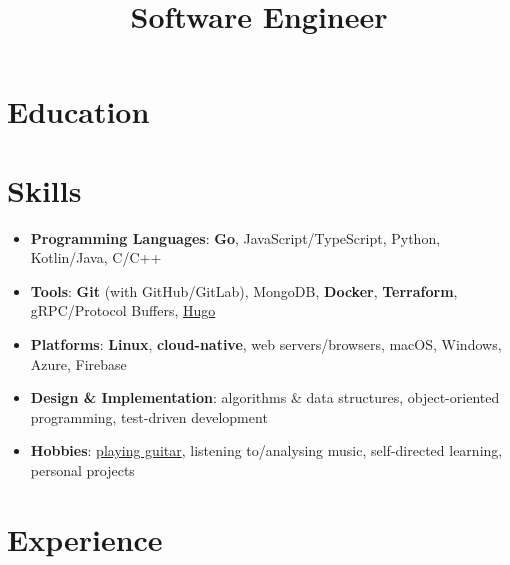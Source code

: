\documentclass[
	a4paper,
	10pt,
	roman,
	colorlinks,
	linkcolor = purple,
	filecolor = purple,
	citecolor = blue,
	urlcolor = blue
]{moderncv}
\title{Software Engineer}
\begin{document}
	\maketitle
	\section{Education}

	\section{Skills}\label{sec:skills}
	\begin{itemize}
		\item \textbf{Programming Languages}: \textbf{Go}, JavaScript/TypeScript, Python, Kotlin/Java, C/C++
		\item \textbf{Tools}: \textbf{Git} (with GitHub/GitLab), MongoDB, \textbf{Docker}, \textbf{Terraform}, gRPC/Protocol Buffers, \href{https://gohugo.io}{Hugo}
		\item \textbf{Platforms}: \textbf{Linux}, \textbf{cloud-native}, web servers/browsers, macOS, Windows, Azure, Firebase
		\item \textbf{Design \& Implementation}: algorithms \& data structures, object-oriented programming, test-driven development
		\item \textbf{Hobbies}: \href{https://applegamer22.github.io/about/#hobbies}{playing guitar}, listening to/analysing music, self-directed learning, personal projects
	\end{itemize}

	\section{Experience}
\end{document}
